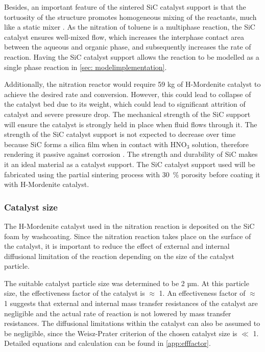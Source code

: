 Besides, an important feature of the sintered SiC catalyst support is that the tortuosity of the structure promotes homogeneous mixing of the reactants, much like a static mixer \cite{duong-viet_silicon_2016}. As the nitration of toluene is a multiphase reaction, the SiC catalyst ensures well-mixed flow, which increases the interphase contact area between the aqueous and organic phase, and subsequently increases the rate of reaction. Having the SiC catalyst support allows the reaction to be modelled as a single phase reaction in \cref{sec: modelimplementation}.

Additionally, the nitration reactor would require 59 kg of H-Mordenite catalyst to achieve the desired rate and conversion. However, this could lead to collapse of the catalyst bed due to its weight, which could lead to significant attrition of catalyst and severe pressure drop. The mechanical strength of the SiC support will ensure the catalyst is strongly held in place when fluid flows through it. The strength of the SiC catalyst support is not expected to decrease over time because SiC forms a silica film when in contact with HNO$_3$ solution, therefore rendering it passive against corrosion \cite{cook_corrosion_2013}. The strength and durability of SiC makes it an ideal material as a catalyst support. The SiC catalyst support used will be fabricated using the partial sintering process with \SI{30}{\%} porosity before coating it with H-Mordenite catalyst.

\subsubsection{Catalyst size}
The H-Mordenite catalyst used in the nitration reaction is deposited on the SiC foam by washcoating. Since the nitration reaction takes place on the surface of the catalyst, it is important to reduce the effect of external and internal diffusional limitation of the reaction depending on the size of the catalyst particle.  

The suitable catalyst particle size was determined to be 2 µm. At this particle size, the effectiveness factor of the catalyst is $\approx$ 1. An effectiveness factor of $\approx$ 1 suggests that external and internal mass transfer resistances of the catalyst are negligible and the actual rate of reaction is not lowered by mass transfer resistances. The diffusional limitations within the catalyst can also be assumed to be negligible, since the Weisz-Prater criterion of the chosen catalyst size is $\ll$ 1. Detailed equations and calculation can be found in \cref{app:efffactor}.

